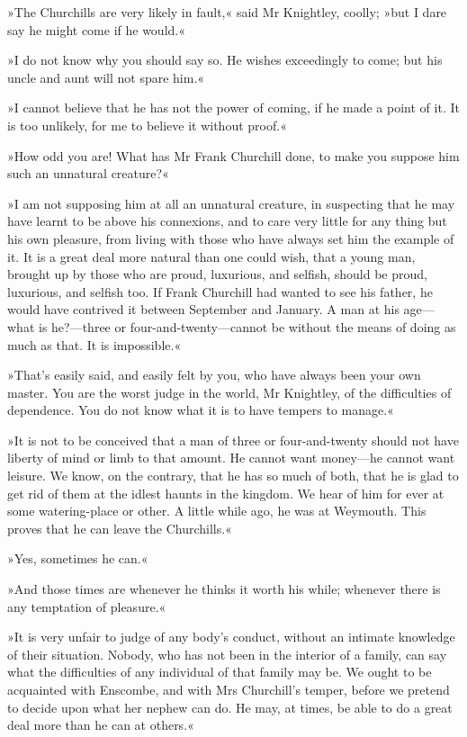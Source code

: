»The Churchills are very likely in fault,« said Mr Knightley, coolly; »but I dare say he might come if he would.«

»I do not know why you should say so. He wishes exceedingly to come; but his uncle and aunt will not spare him.«

»I cannot believe that he has not the power of coming, if he made a point of it. It is too unlikely, for me to believe it without proof.«

»How odd you are! What has Mr Frank Churchill done, to make you suppose him such an unnatural creature?«

»I am not supposing him at all an unnatural creature, in suspecting that he may have learnt to be above his connexions, and to care very little for any thing but his own pleasure, from living with those who have always set him the example of it. It is a great deal more natural than one could wish, that a young man, brought up by those who are proud, luxurious, and selfish, should be proud, luxurious, and selfish too. If Frank Churchill had wanted to see his father, he would have contrived it between September and January. A man at his age—what is he?—three or four-and-twenty—cannot be without the means of doing as much as that. It is impossible.«

»That's easily said, and easily felt by you, who have always been your own master. You are the worst judge in the world, Mr Knightley, of the difficulties of dependence. You do not know what it is to have tempers to manage.«

»It is not to be conceived that a man of three or four-and-twenty should not have liberty of mind or limb to that amount. He cannot want money—he cannot want leisure. We know, on the contrary, that he has so much of both, that he is glad to get rid of them at the idlest haunts in the kingdom. We hear of him for ever at some watering-place or other. A little while ago, he was at Weymouth. This proves that he can leave the Churchills.«

»Yes, sometimes he can.«

»And those times are whenever he thinks it worth his while; whenever there is any temptation of pleasure.«

»It is very unfair to judge of any body's conduct, without an intimate knowledge of their situation. Nobody, who has not been in the interior of a family, can say what the difficulties of any individual of that family may be. We ought to be acquainted with Enscombe, and with Mrs Churchill's temper, before we pretend to decide upon what her nephew can do. He may, at times, be able to do a great deal more than he can at others.«

